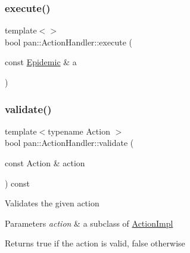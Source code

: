 \mbox{\label{classpan_1_1_action_handler_a469f04bd874aca38c9b3792aee209703}} 
\subsubsection{\texorpdfstring{execute()}{execute()}\hspace{0.1cm}{\footnotesize\ttfamily [14/14]}}
{\footnotesize\ttfamily template$<$$>$ \\
bool pan\+::\+Action\+Handler\+::execute (\begin{DoxyParamCaption}\item[{const \hyperlink{classpan_1_1_epidemic}{Epidemic} \&}]{a }\end{DoxyParamCaption})}

\mbox{\label{classpan_1_1_action_handler_ae2a8bd5ae0560677aeafe7b6c068adb7}} 
\subsubsection{\texorpdfstring{validate()}{validate()}\hspace{0.1cm}{\footnotesize\ttfamily [1/14]}}
{\footnotesize\ttfamily template$<$typename Action $>$ \\
bool pan\+::\+Action\+Handler\+::validate (\begin{DoxyParamCaption}\item[{const Action \&}]{action }\end{DoxyParamCaption}) const}

Validates the given action 
\begin{DoxyParams}{Parameters}
{\em action} & a subclass of \hyperlink{classpan_1_1_action_impl}{Action\+Impl} \\
\hline
\end{DoxyParams}
\begin{DoxyReturn}{Returns}
true if the action is valid, false otherwise 
\end{DoxyReturn}
\mbox{\label{classpan_1_1_action_handler_a3e2fc1b454ace0dd42b3b4bacc22eb0d}} 
